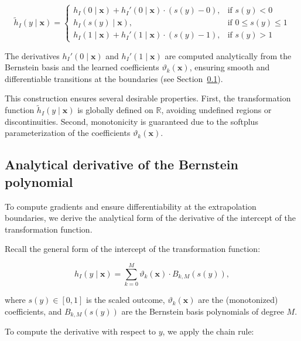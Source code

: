\begin{equation}
\tilde{h}_I(y \mid \mathbf{x}) =
\begin{cases}
h_I(0 \mid \mathbf{x}) + h_I'(0 \mid \mathbf{x}) \cdot (s(y) - 0), & \text{if } s(y) < 0 \\
h_I(s(y) \mid \mathbf{x}), & \text{if } 0 \leq s(y) \leq 1 \\
h_I(1 \mid \mathbf{x}) + h_I'(1 \mid \mathbf{x}) \cdot (s(y) - 1), & \text{if } s(y) > 1
\end{cases}
\label{eq:extended_bernstein}
\end{equation}

The derivatives $h_I'(0 \mid \mathbf{x})$ and $h_I'(1 \mid \mathbf{x})$ are computed analytically from the Bernstein basis and the learned coefficients $\vartheta_k(\mathbf{x})$, ensuring smooth and differentiable transitions at the boundaries (see Section~\ref{sec:analytical_derivative_bernstein}).

This construction ensures several desirable properties. First, the transformation function $\tilde{h}_I(y \mid \mathbf{x})$ is globally defined on $\mathbb{R}$, avoiding undefined regions or discontinuities. Second, monotonicity is guaranteed due to the softplus parameterization of the coefficients $\vartheta_k(\mathbf{x})$.




\subsection{Analytical derivative of the Bernstein polynomial} \label{sec:analytical_derivative_bernstein}

To compute gradients and ensure differentiability at the extrapolation boundaries, we derive the analytical form of the derivative of the intercept of the transformation function.

Recall the general form of the intercept of the transformation function:

\begin{equation}
h_I(y \mid \mathbf{x}) = \sum_{k=0}^{M} \vartheta_k(\mathbf{x}) \cdot B_{k, M}(s(y)),
\end{equation}

where $s(y) \in [0, 1]$ is the scaled outcome, $\vartheta_k(\mathbf{x})$ are the (monotonized) coefficients, and $B_{k, M}(s(y))$ are the Bernstein basis polynomials of degree $M$.

To compute the derivative with respect to $y$, we apply the chain rule:

